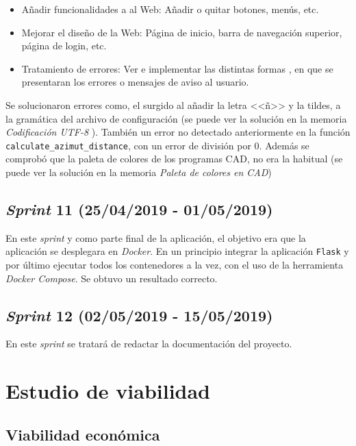 \begin{itemize}
\item Añadir funcionalidades a al Web: Añadir o quitar botones, menús, etc.

\item  Mejorar el diseño de la Web: Página de inicio, barra de navegación superior, página de login, etc.

\item Tratamiento de errores: Ver e implementar las distintas formas , en que se presentaran los errores o mensajes de aviso al usuario.

\end{itemize}

Se solucionaron errores como, el surgido al añadir la letra <<ñ>> y la tildes, a la gramática del archivo de configuración (se puede ver la solución en la memoria \textit{ Codificación UTF-8 }). También un error no detectado anteriormente en la función  \texttt{calculate\_azimut\_distance}, con un error de división por 0.
Además se comprobó que la paleta de colores de los programas CAD, no era la habitual (se puede ver la solución en la memoria \textit{ Paleta de colores en CAD})

\subsection{\emph{Sprint} 11 (25/04/2019 - 01/05/2019)}

En este \emph{sprint} y como parte final de la aplicación, el objetivo era que la aplicación se desplegara en \emph{Docker}. En un principio integrar la aplicación \texttt{Flask} y por último ejecutar todos los contenedores a la vez, con el uso de la herramienta \emph{Docker Compose}. Se obtuvo un resultado correcto.

\subsection{\emph{Sprint} 12 (02/05/2019 - 15/05/2019)}

En este \emph{sprint} se tratará de redactar la documentación del proyecto.

\section{Estudio de viabilidad}

\subsection{Viabilidad económica}

